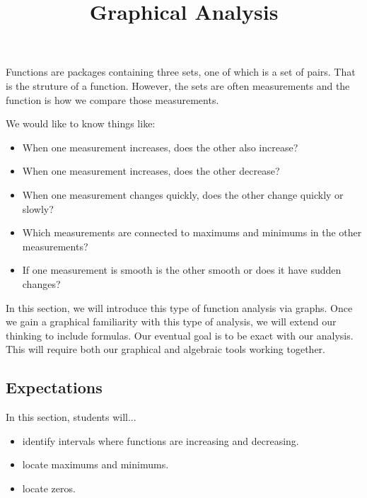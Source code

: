 \documentclass{ximera}
\title{Graphical Analysis}
\begin{document}
\begin{abstract}
\end{abstract}
\maketitle




Functions are packages containing three sets, one of which is a set of pairs.  That is the struture of a function.  However, the sets are often measurements and the function is how we compare those measurements.

We would like to know things like:

\begin{itemize}
\item When one measurement increases, does the other also increase?
\item When one measurement increases, does the other decrease?
\item When one measurement changes quickly, does the other change quickly or slowly?
\item Which measurements are connected to maximums and minimums in the other measurements?
\item If one measurement is smooth is the other smooth or does it have sudden changes?
\end{itemize}


In this section, we will introduce this type of function analysis via graphs. Once we gain a graphical familiarity with this type of analysis, we will extend our thinking to include formulas.  Our eventual goal is to be exact with our analysis.  This will require both our graphical and algebraic tools working together.









\subsection{Expectations}

\begin{sectionOutcomes}
In this section, students will...

\begin{itemize}
\item identify intervals where functions are increasing and decreasing.
\item locate maximums and minimums.
\item locate zeros.
\end{itemize}
\end{sectionOutcomes}
\end{document}
